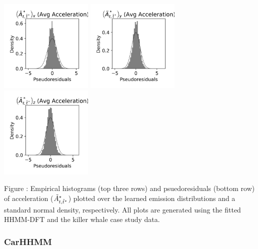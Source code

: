 \documentclass{article}
\begin{document}
\begin{center}
        \includegraphics[width=1.75in]{../Plots/HHMM_psedoresids_Ax.png}
        \includegraphics[width=1.75in]{../Plots/HHMM_psedoresids_Ay.png}
        \includegraphics[width=1.75in]{../Plots/HHMM_psedoresids_Az.png}
        \end{center}
        
        \noindent Figure : Empirical histograms (top three rows) and psuedoresiduals (bottom row) of acceleration ($\tilde{A}^*_{t,\tilde t^*}$) plotted over the learned emission distributions and a standard normal density, respectively. All plots are generated using the fitted HHMM-DFT and the killer whale case study data.
        \addtocounter{fignum}{1}
        
        \newpage
        
        \subsubsection{CarHHMM}
        
\end{document}
